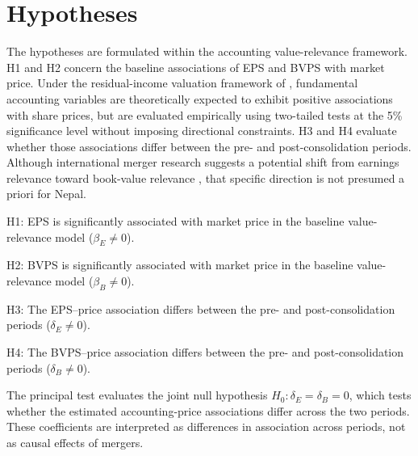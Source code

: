 \section{Hypotheses}

The hypotheses are formulated within the accounting value-relevance framework.
H1 and H2 concern the baseline associations of EPS and BVPS with market price.
Under the residual-income valuation framework of \citet{ohlson1995}, fundamental
accounting variables are theoretically expected to exhibit positive associations
with share prices, but are evaluated empirically using two-tailed tests at the
5\% significance level without imposing directional constraints. H3 and H4
evaluate whether those associations differ between the pre- and
post-consolidation periods. Although international merger research suggests a
potential shift from earnings relevance toward book-value relevance
\citep{kwon2020}, that specific direction is not presumed a priori for Nepal.

\noindent H1: EPS is significantly associated with market price in the baseline
value-relevance model ($\beta_E \ne 0$).

\noindent H2: BVPS is significantly associated with market price in the baseline
value-relevance model ($\beta_B \ne 0$).

\noindent H3: The EPS--price association differs between the pre- and
post-consolidation periods ($\delta_E \ne 0$).

\noindent H4: The BVPS--price association differs between the pre- and
post-consolidation periods ($\delta_B \ne 0$).

\noindent The principal test evaluates the joint null hypothesis
$H_0: \delta_E = \delta_B = 0$, which tests whether the estimated
accounting-price associations differ across the two periods. These coefficients
are interpreted as differences in association across periods, not as causal
effects of mergers.

